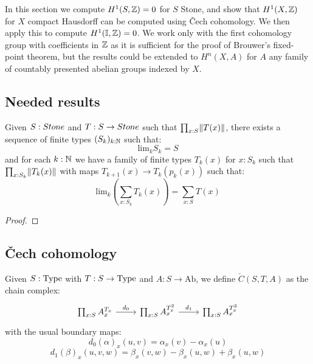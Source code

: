 In this section we compute $H^1(S,\mathbb{Z}) = 0$ for $S$ Stone, and show that $H^1(X,\mathbb{Z})$ for $X$ compact Hausdorff can be computed using \v{C}ech cohomology. We then apply this to compute $H^1(\mathbb{I},\mathbb{Z})=0$. We work only with the first cohomology group with coefficients in $\mathbb{Z}$ as it is sufficient for the proof of Brouwer's fixed-point theorem, but the results could be extended to $H^n(X,A)$ for $A$ any family of countably presented abelian groups indexed by $X$.

\subsection{Needed results}


\begin{lemma}\label{finite-approximation-surjection-stone}
Given $S:\Stone$ and $T:S\to\Stone$ such that $\prod_{x:S}\lVert T(x) \rVert$, there exists a sequence of finite types $(S_k)_{k:\mathbb{N}}$
such that: 
\[\mathrm{lim}_kS_k = S\]
and for each $k:\mathbb{N}$ we have a family of finite types $T_k(x)$ for $x:S_k$ such that $\prod_{x:S_k}\lVert T_k(x) \rVert$ with maps $T_{k+1}(x) \to T_k(p_k(x))$ such that:
\[\mathrm{lim}_k\left(\sum_{x:S_k}T_k(x)\right) = \sum_{x:S}T(x)\]
\end{lemma}

\begin{proof}
\end{proof}


\subsection{\v{C}ech cohomology}

\begin{definition}
Given $S:\mathrm{Type}$ with $T:S\to \mathrm{Type}$ and $A:S\to\mathrm{Ab}$, we define $\check{C}(S,T,A)$ as the chain complex:
\begin{equation}
\begin{tikzcd}
     \prod_{x:S}A_x^{T_x} \ar[r,"d_0"] & \prod_{x:S}A_x^{T_x^2}\ar[r,"d_1"] &  \prod_{x:S}A_x^{T_x^3}
\end{tikzcd}
\end{equation}
with the usual boundary maps:
\[d_0(\alpha)_x(u,v) = \alpha_x(v)-\alpha_x(u)\]
\[d_1(\beta)_x(u,v,w) = \beta_x(v,w) - \beta_x(u,w) + \beta_x(u,w)\]
\end{definition}

